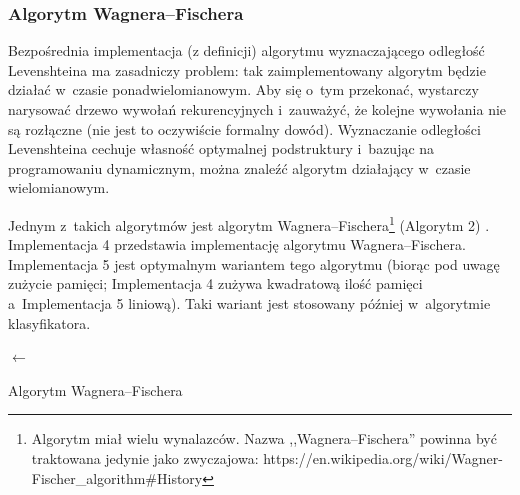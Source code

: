 \subsubsection{Algorytm Wagnera--Fischera}
Bezpośrednia implementacja (z definicji) algorytmu wyznaczającego odległość
Levenshteina ma zasadniczy problem: tak zaimplementowany algorytm będzie działać
w~czasie ponadwielomianowym. Aby się o~tym przekonać, wystarczy narysować drzewo
wywołań rekurencyjnych i~zauważyć, że kolejne wywołania nie są rozłączne (nie
jest to oczywiście formalny dowód). Wyznaczanie odległości Levenshteina cechuje
własność optymalnej podstruktury i~bazując na programowaniu dynamicznym, można
znaleźć algorytm działający w~czasie wielomianowym.

Jednym z~takich algorytmów jest algorytm Wagnera--Fischera\footnote{Algorytm
	miał wielu wynalazców. Nazwa ,,Wagnera--Fischera'' powinna być traktowana
	jedynie jako zwyczajowa:
	https://en.wikipedia.org/wiki/Wagner-Fischer\_algorithm\#History} (Algorytm
2) \cite{wagner1974string}. Implementacja 4 przedstawia implementację
algorytmu Wagnera--Fischera. Implementacja 5 jest optymalnym wariantem tego
algorytmu (biorąc pod uwagę zużycie pamięci; Implementacja 4 zużywa
kwadratową ilość pamięci a~Implementacja 5 liniową). Taki wariant jest
stosowany później w~algorytmie klasyfikatora.

\begin{algorithm}
	\SetAlgoVlined
	\BlankLine
	\BlankLine
	\VarD $\leftarrow$ \VarE{$0 \dots$ \VarM, $0 \dots$ \VarN}\;
	\Return{\VarD{\VarM, \VarN}}\;
	\caption{Algorytm Wagnera--Fischera}
\end{algorithm}



